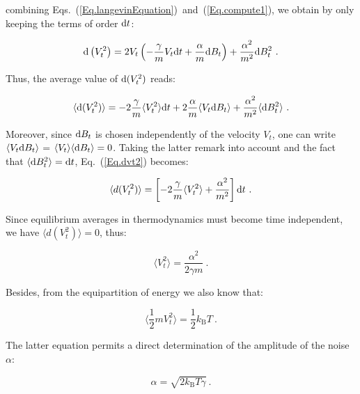 combining Eqs.~(\ref{Eq.langevinEquation})~and~(\ref{Eq.compute1}), we obtain by only keeping  the terms of order $\textnormal{d}t$:

\begin{equation}
	\textnormal{d}\left(V_t^2\right) = 2V_t\left( -\frac{\gamma}{m}V_t\textnormal{d}t + \frac{\alpha}{m}\textnormal{d}B_t  \right) + \frac{\alpha^2}{m^2}\textnormal{d}B_t ^2 ~. 
\end{equation}

Thus, the average value of $ \textnormal{d}(V_t ^2)$ reads:

\begin{equation}
	\langle \textnormal{d}(V_t ^2)\rangle = -2 \frac{\gamma}{m} \langle V_t ^2 \rangle \textnormal dt + 2 \frac{\alpha}{m} \langle V_t \textnormal{d}B_t \rangle + \frac{\alpha^2}{m^2} \langle \textnormal{d}B_t ^2 \rangle~.
	\label{Eq.dvt2}
\end{equation} 

Moreover, since $\textnormal{d}B_t$ is chosen independently of the velocity $V_t$, one can write $\langle V_t \textnormal{d}B_t \rangle $ = $\langle V_t \rangle \langle \textnormal{d}B_t \rangle  =0 $. Taking the latter remark into account and the fact that $\langle \textnormal{d}B_t ^2\rangle = \textnormal{d}t $, Eq.~(\ref{Eq.dvt2}) becomes:

\begin{equation}
	\langle d(V_t^2) \rangle = \left[-2 \frac{\gamma}{m} \langle V_t ^2 \rangle + \frac{\alpha^2}{m^2}\right]\textnormal{d}t~.
\end{equation}

Since equilibrium averages in thermodynamics must become time independent, we have $\langle d(V_t^2) \rangle = 0$, thus:

\begin{equation}
	\langle V_t ^2\rangle = \frac{\alpha ^2}{2 \gamma m}~. 
\end{equation}

Besides, from the equipartition of energy we also know that:

\begin{equation}
	\langle \frac{1}{2} m V_t ^2 \rangle  = \frac{1}{2} k_\mathrm{B} T~.
\end{equation}

The latter equation permits a direct determination of the amplitude of the noise $\alpha$: 

\begin{equation}
	\alpha = \sqrt{2k_\mathrm{B}T \gamma}~.
\end{equation}

